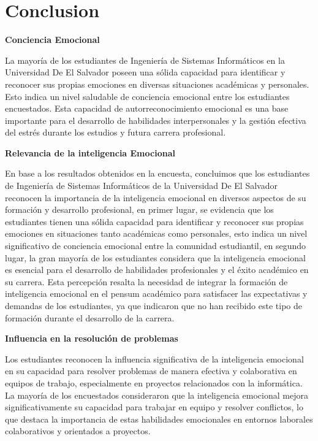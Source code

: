 \documentclass[journal]{IEEEtran}
\begin{document}
\section{Conclusion}
\begin{center}
	\textbf{Conciencia Emocional}
\end{center}
La mayoría de los estudiantes de Ingeniería de Sistemas Informáticos en la Universidad De El Salvador poseen una sólida capacidad para identificar y reconocer sus propias emociones en diversas situaciones académicas y personales. Esto indica un nivel saludable de conciencia emocional entre los estudiantes encuestados. Esta capacidad de autorreconocimiento emocional es una base importante para el desarrollo de habilidades interpersonales y la gestión efectiva del estrés durante los estudios y futura carrera profesional.
\begin{center}
	\textbf{Relevancia de la inteligencia Emocional}
\end{center}
En base a los resultados obtenidos en la encuesta, concluimos que los estudiantes de Ingeniería de Sistemas Informáticos de la Universidad De El Salvador reconocen la importancia de la inteligencia emocional en diversos aspectos de su formación y desarrollo profesional, en primer lugar, se evidencia que los estudiantes tienen una sólida capacidad para identificar y reconocer sus propias emociones en situaciones tanto académicas como personales, esto indica un nivel significativo de conciencia emocional entre la comunidad estudiantil, en segundo lugar, la gran mayoría de los estudiantes considera que la inteligencia emocional es esencial para el desarrollo de habilidades profesionales y el éxito académico en su carrera. Esta percepción resalta la necesidad de integrar la formación de inteligencia emocional en el pensum académico para satisfacer las expectativas y demandas de los estudiantes, ya que indicaron que no han recibido este tipo de formación durante el desarrollo de la carrera.
\begin{center}
	\textbf{Influencia en la resolución de problemas}
\end{center}
Los estudiantes reconocen la influencia significativa de la inteligencia emocional en su capacidad para resolver problemas de manera efectiva y colaborativa en equipos de trabajo, especialmente en proyectos relacionados con la informática. La mayoría de los encuestados consideraron que la inteligencia emocional mejora significativamente su capacidad para trabajar en equipo y resolver conflictos, lo que destaca la importancia de estas habilidades emocionales en entornos laborales colaborativos y orientados a proyectos.
\end{document}
